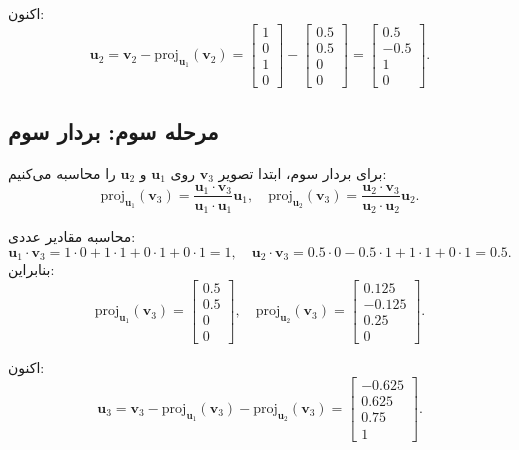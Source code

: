 \begin{example}
	اکنون:
	\[
	\mathbf{u}_2 = \mathbf{v}_2 - \text{proj}_{\mathbf{u}_1}(\mathbf{v}_2) = \begin{bmatrix} 1 \\ 0 \\ 1 \\ 0 \end{bmatrix} - \begin{bmatrix} 0.5 \\ 0.5 \\ 0 \\ 0 \end{bmatrix} = \begin{bmatrix} 0.5 \\ -0.5 \\ 1 \\ 0 \end{bmatrix}.
	\]
\end{example}
\begin{example}
	\subsection*{مرحله سوم: بردار سوم}
	برای بردار سوم، ابتدا تصویر \( \mathbf{v}_3 \) روی \( \mathbf{u}_1 \) و \( \mathbf{u}_2 \) را محاسبه می‌کنیم:
	\[
	\text{proj}_{\mathbf{u}_1}(\mathbf{v}_3) = \frac{\mathbf{u}_1 \cdot \mathbf{v}_3}{\mathbf{u}_1 \cdot \mathbf{u}_1} \mathbf{u}_1, \quad
	\text{proj}_{\mathbf{u}_2}(\mathbf{v}_3) = \frac{\mathbf{u}_2 \cdot \mathbf{v}_3}{\mathbf{u}_2 \cdot \mathbf{u}_2} \mathbf{u}_2.
	\]
	
	محاسبه مقادیر عددی:
	\[
	\mathbf{u}_1 \cdot \mathbf{v}_3 = 1 \cdot 0 + 1 \cdot 1 + 0 \cdot 1 + 0 \cdot 1 = 1, \quad
	\mathbf{u}_2 \cdot \mathbf{v}_3 = 0.5 \cdot 0 - 0.5 \cdot 1 + 1 \cdot 1 + 0 \cdot 1 = 0.5.
	\]
	بنابراین:
	\[
	\text{proj}_{\mathbf{u}_1}(\mathbf{v}_3) = \begin{bmatrix} 0.5 \\ 0.5 \\ 0 \\ 0 \end{bmatrix}, \quad
	\text{proj}_{\mathbf{u}_2}(\mathbf{v}_3) = \begin{bmatrix} 0.125 \\ -0.125 \\ 0.25 \\ 0 \end{bmatrix}.
	\]
	
	اکنون:
	\[
	\mathbf{u}_3 = \mathbf{v}_3 - \text{proj}_{\mathbf{u}_1}(\mathbf{v}_3) - \text{proj}_{\mathbf{u}_2}(\mathbf{v}_3) = \begin{bmatrix} -0.625 \\ 0.625 \\ 0.75 \\ 1 \end{bmatrix}.
	\]
\end{example}

